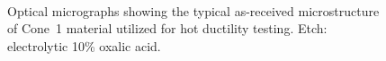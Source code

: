 {%



\begin{figure}
    \centering
     \\
    \caption[Optical micrographs showing the typical as-received microstructure of Cone~1 Material.]{Optical micrographs showing the typical as-received microstructure of Cone~1 material utilized for hot ductility testing.  Etch: electrolytic 10\% oxalic acid.}
    \label{fig:c1-asreceived}
\end{figure}

}
